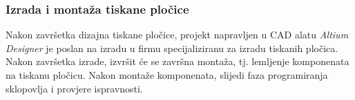 \documentclass[11pt,a4paper]{article}
\begin{document}
\subsubsection{Izrada i montaža tiskane pločice}
Nakon završetka dizajna tiskane pločice, projekt napravljen u CAD alatu \textit{Altium Designer} je poslan na izradu u firmu specijaliziranu za izradu tiskanih pločica.  Nakon završetka izrade, izvršit će se završna montaža, tj. lemljenje komponenata na tiskanu pločicu. Nakon montaže komponenata, slijedi faza programiranja sklopovlja i provjere ispravnosti.
\end{document}
